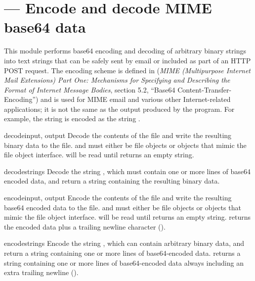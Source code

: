 \section{ ---
         Encode and decode MIME base64 data}




This module performs base64 encoding and decoding of arbitrary binary
strings into text strings that can be safely sent by email or included
as part of an HTTP POST request.  The
encoding scheme is defined in  (\emph{MIME
(Multipurpose Internet Mail Extensions) Part One: Mechanisms for
Specifying and Describing the Format of Internet Message Bodies},
section 5.2, ``Base64 Content-Transfer-Encoding'') and is used for
MIME email and various other Internet-related applications; it is not
the same as the output produced by the  program.
For example, the string  is encoded as the
string .  


\begin{funcdesc}{decode}{input, output}
Decode the contents of the  file and write the resulting
binary data to the  file.
 and  must either be file objects or objects that
mimic the file object interface.  will be read until
 returns an empty string.
\end{funcdesc}

\begin{funcdesc}{decodestring}{s}
Decode the string , which must contain one or more lines of
base64 encoded data, and return a string containing the resulting
binary data.
\end{funcdesc}

\begin{funcdesc}{encode}{input, output}
Encode the contents of the  file and write the resulting
base64 encoded data to the  file.
 and  must either be file objects or objects that
mimic the file object interface.  will be read until
 returns an empty string.  
returns the encoded data plus a trailing newline character
().
\end{funcdesc}

\begin{funcdesc}{encodestring}{s}
Encode the string , which can contain arbitrary binary data,
and return a string containing one or more lines of
base64-encoded data.   returns a
string containing one or more lines of base64-encoded data
always including an extra trailing newline ().
\end{funcdesc}

